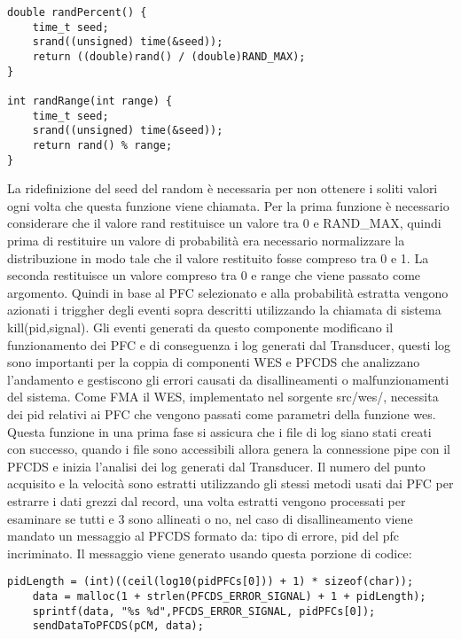 \documentclass{article}
\begin{document}
\begin{flushleft}
\begin{lstlisting}[frame=single]
double randPercent() {
    time_t seed;
    srand((unsigned) time(&seed));
    return ((double)rand() / (double)RAND_MAX);
}

int randRange(int range) {
    time_t seed;
    srand((unsigned) time(&seed));
    return rand() % range;
}
\end{lstlisting}

La ridefinizione del seed del random è necessaria per non ottenere i soliti valori ogni volta che questa funzione viene chiamata. Per la prima funzione è necessario considerare che il valore rand restituisce un valore tra 0 e RAND\_MAX, quindi prima di restituire un valore di probabilità era necessario normalizzare la distribuzione in modo tale che il valore restituito fosse compreso tra 0 e 1. La seconda restituisce un valore compreso tra 0 e range che viene passato come argomento. Quindi in base al PFC selezionato e alla probabilità estratta vengono azionati i triggher degli eventi sopra descritti utilizzando la chiamata di sistema kill(pid,signal). Gli eventi generati da questo componente modificano il funzionamento dei PFC e di conseguenza i log generati dal Transducer, questi log sono importanti per la coppia di componenti WES e PFCDS che analizzano l'andamento e gestiscono gli errori causati da disallineamenti o malfunzionamenti del sistema. Come FMA il WES, implementato nel sorgente src/wes/, necessita dei pid relativi ai PFC che vengono passati come parametri della funzione wes. Questa funzione in una prima fase si assicura che i file di log siano stati creati con successo, quando i file sono accessibili allora genera la connessione pipe con il PFCDS e inizia l'analisi dei log generati dal Transducer. Il numero del punto acquisito e la velocità sono estratti utilizzando gli stessi metodi usati dai PFC per estrarre i dati grezzi dal record, una volta estratti vengono processati per esaminare se tutti e 3 sono allineati o no, nel caso di disallineamento viene mandato un messaggio al PFCDS formato da: tipo di errore, pid del pfc incriminato. Il messaggio viene generato usando questa porzione di codice:

\begin{lstlisting}[frame=single]
    pidLength = (int)((ceil(log10(pidPFCs[0])) + 1) * sizeof(char));
    data = malloc(1 + strlen(PFCDS_ERROR_SIGNAL) + 1 + pidLength);
    sprintf(data, "%s %d",PFCDS_ERROR_SIGNAL, pidPFCs[0]);
    sendDataToPFCDS(pCM, data);
\end{lstlisting}


\end{flushleft}
\end{document}
